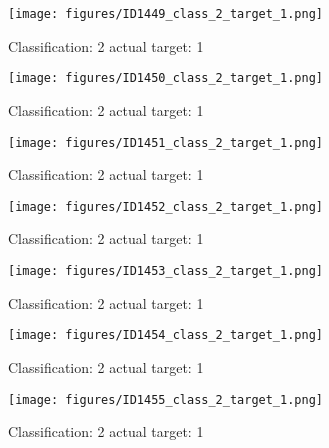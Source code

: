 \begin{figure}[h!]
\begin{center}
\texttt{[image: figures/ID1449\_class\_2\_target\_1.png]}
\end{center}
\caption{ Classification: 2 actual target: 1}
\label{fig:ID1449_class_2_target_1}
\end{figure}
\begin{figure}[h!]
\begin{center}
\texttt{[image: figures/ID1450\_class\_2\_target\_1.png]}
\end{center}
\caption{ Classification: 2 actual target: 1}
\label{fig:ID1450_class_2_target_1}
\end{figure}
\begin{figure}[h!]
\begin{center}
\texttt{[image: figures/ID1451\_class\_2\_target\_1.png]}
\end{center}
\caption{ Classification: 2 actual target: 1}
\label{fig:ID1451_class_2_target_1}
\end{figure}
\begin{figure}[h!]
\begin{center}
\texttt{[image: figures/ID1452\_class\_2\_target\_1.png]}
\end{center}
\caption{ Classification: 2 actual target: 1}
\label{fig:ID1452_class_2_target_1}
\end{figure}
\begin{figure}[h!]
\begin{center}
\texttt{[image: figures/ID1453\_class\_2\_target\_1.png]}
\end{center}
\caption{ Classification: 2 actual target: 1}
\label{fig:ID1453_class_2_target_1}
\end{figure}
\begin{figure}[h!]
\begin{center}
\texttt{[image: figures/ID1454\_class\_2\_target\_1.png]}
\end{center}
\caption{ Classification: 2 actual target: 1}
\label{fig:ID1454_class_2_target_1}
\end{figure}
\begin{figure}[h!]
\begin{center}
\texttt{[image: figures/ID1455\_class\_2\_target\_1.png]}
\end{center}
\caption{ Classification: 2 actual target: 1}
\label{fig:ID1455_class_2_target_1}
\end{figure}
